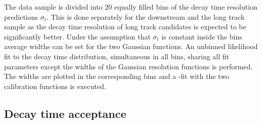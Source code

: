 %
The data sample is divided into \num{20} equally filled bins of the decay time
resolution predictions $\sigma_t$. This is done separately for the downstream
and the long track sample as the decay time resolution of long track
candidates is expected to be significantly better. Under the assumption that
$\sigma_t$ is constant inside the bins average widths can be set for the two
Gaussian functions. An unbinned likelihood fit to the decay time distribution,
simultaneous in all bins, sharing all fit parameters except the widths of the
Gaussian resolution functions is performed. The widths are plotted in the
corresponding bins and a \chisq-fit with the two calibration functions is executed.

\subsection{Decay time acceptance}
\label{sec:bd2jpsiks:decaytime:acceptance}